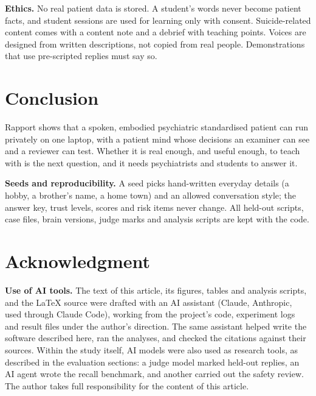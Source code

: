 \documentclass[conference]{IEEEtran}
\begin{document}
\textbf{Ethics.} No real patient data is stored. A student's words never become patient facts, and student sessions are used for learning only with
consent. Suicide-related content comes with a content note and a debrief with teaching points. Voices are designed from written descriptions, not copied
from real people. Demonstrations that use pre-scripted replies must say so.

\section{Conclusion}
Rapport shows that a spoken, embodied psychiatric standardised patient can run privately on one laptop, with a patient mind whose decisions an examiner
can see and a reviewer can test. Whether it is real enough, and useful enough, to teach with is the next question, and it needs
psychiatrists and students to answer it.

\textbf{Seeds and reproducibility.} A seed picks hand-written everyday details (a hobby, a brother's name, a home town) and an allowed
conversation style; the answer key, trust levels, scores and risk items never change. All held-out scripts, case files, brain versions, judge
marks and analysis scripts are kept with the code.

\section*{Acknowledgment}
\textbf{Use of AI tools.} The text of this article, its figures, tables and analysis scripts, and the \LaTeX{} source were
drafted with an AI assistant (Claude, Anthropic, used through Claude Code), working from the project's code, experiment logs and result
files under the author's direction. The same assistant helped write the software described here, ran the analyses, and checked the
citations against their sources. Within the study itself, AI models were also used as research tools, as described in the evaluation sections: a judge model marked held-out replies, an AI agent wrote the recall benchmark, and another carried out the safety review. The author takes full responsibility for the content of this article.



\end{document}
